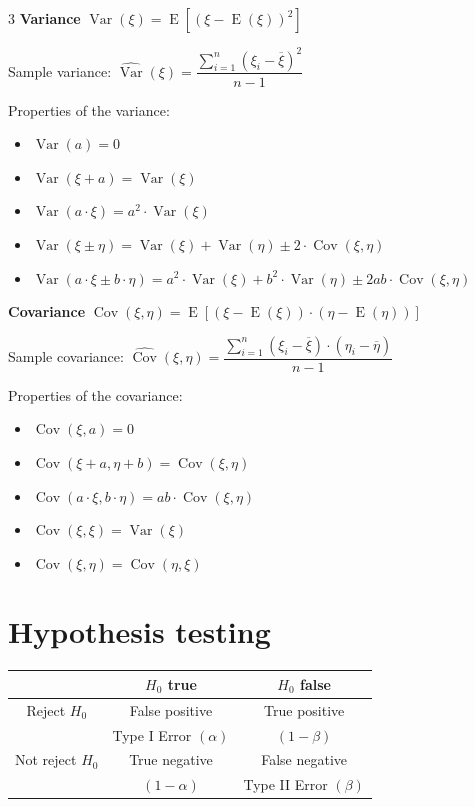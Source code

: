 \documentclass[10pt, a4paper, landscape]{article}
\DeclareMathOperator{\E}{E}
\DeclareMathOperator{\Var}{Var}
\DeclareMathOperator{\Cov}{Cov}
\begin{document}
\begin{multicols}{3}
\textbf{Variance} \quad \( \Var(\xi) = \E \left[ (\xi - \E(\xi))^{2} \right] \)

Sample variance: \quad \( \widehat{\Var}(\xi) = \dfrac{\sum_{i = 1}^{n} (\xi_{i} - \overline{\xi})^2}{n - 1} \)

Properties of the variance:

\begin{itemize}[leftmargin=*]
	\item \( \Var(a) = 0 \)
	\item \( \Var(\xi + a) = \Var(\xi) \)
	\item \( \Var(a \cdot \xi) = a^{2} \cdot \Var(\xi) \)
	\item \( \Var(\xi \pm \eta) = \Var(\xi) + \Var(\eta) \pm 2 \cdot \Cov(\xi, \eta) \)
	\item \( \Var(a \cdot \xi \pm b \cdot \eta) = a^{2} \cdot \Var(\xi) + b^{2} \cdot \Var(\eta) \pm 2 a b \cdot \Cov(\xi, \eta) \)
\end{itemize}

\textbf{Covariance} \quad \( \Cov(\xi, \eta) = \E \left[ (\xi - \E(\xi)) \cdot (\eta - \E(\eta)) \right] \)

Sample covariance: \quad \( \widehat{\Cov}(\xi, \eta) = \dfrac{\sum_{i = 1}^{n} (\xi_{i} - \overline{\xi}) \cdot (\eta_{i} - \overline{\eta})}{n - 1} \)

Properties of the covariance:

\begin{itemize}[leftmargin=*]
	\item \( \Cov(\xi, a) = 0 \)
	\item \( \Cov(\xi + a, \eta + b) = \Cov(\xi, \eta) \)
	\item \( \Cov(a \cdot \xi, b \cdot \eta) = a b \cdot \Cov(\xi, \eta) \)
	\item \( \Cov(\xi, \xi) = \Var(\xi) \)
	\item \( \Cov(\xi, \eta) = \Cov(\eta, \xi) \)
\end{itemize}

\columnbreak

\section*{Hypothesis testing}

\begin{center}
	\begin{tabular}{ c | c | c }
		                       & \( H_{0} \) true            & \( H_{0} \) false           \\ \hline
		Reject \( H_{0} \)     & False positive              & True positive               \\
		                       & Type I Error \( (\alpha) \) & \( (1 - \beta) \)           \\ \hline
		Not reject \( H_{0} \) & True negative               & False negative              \\
		                       & \( (1 - \alpha) \)          & Type II Error \( (\beta) \)
	\end{tabular}
\end{center}


\end{multicols}
\end{document}
